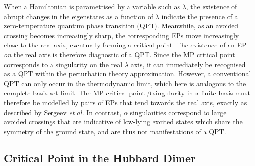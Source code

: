 \documentclass[aps,prb,reprint,noshowkeys,linenumbers,superscriptaddress]{revtex4-1}
\newcommand{\etal}{\textit{et al.}}
\begin{document}
When a Hamiltonian is parametrised by a variable such as $\lambda$, the existence of abrupt changes in the 
eigenstates as a function of $\lambda$ indicate the presence of a zero-temperature quantum phase transition (QPT).%
\cite{Heiss_1988,Heiss_2002,Borisov_2015,Sindelka_2017,CarrBook,Vojta_2003,SachdevBook,GilmoreBook} 
Meanwhile, as an avoided crossing becomes increasingly sharp, the corresponding EPs move increasingly close to the real axis, eventually forming a critical point.
The existence of an EP \emph{on} the real axis is therefore diagnostic of a QPT.\cite{Cejnar_2005, Cejnar_2007a}
Since the MP critical point corresponds to a singularity on the real $\lambda$ axis, it can immediately be
recognised as a QPT within the perturbation theory approximation.
However, a conventional QPT can only occur in the thermodynamic limit, which here is analogous to the complete 
basis set limit.\cite{Kais_2006}
The MP critical point $\beta$ singularity in a finite basis must therefore be modelled by pairs of EPs
that tend towards the real axis, exactly as described by Sergeev \etal\cite{Sergeev_2005}
In contrast, $\alpha$ singularities correspond to large avoided crossings that are indicative of low-lying excited
states which share the symmetry of the ground state,\cite{Goodson_2004} and are thus not manifestations of a QPT.

\subsection{Critical Point in the Hubbard Dimer}
\label{sec:critical_point_hubbard}
\end{document}
